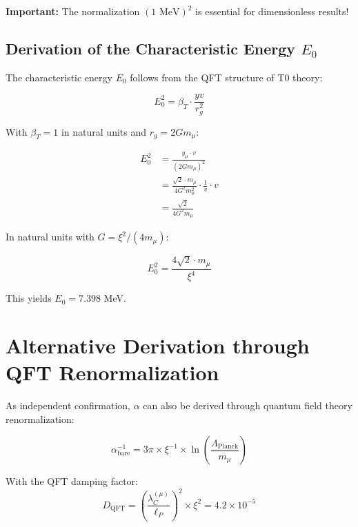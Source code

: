 \documentclass[12pt,a4paper]{article}
\begin{document}
	\begin{important}
		\textbf{Important:} The normalization $(1 \text{ MeV})^2$ is essential for dimensionless results!
	\end{important}
	
	\subsection{Derivation of the Characteristic Energy $E_0$}
	
	The characteristic energy $E_0$ follows from the QFT structure of T0 theory:
	
	\begin{equation}
		E_0^2 = \beta_T \cdot \frac{yv}{r_g^2}
	\end{equation}
	
	With $\beta_T = 1$ in natural units and $r_g = 2Gm_\mu$:
	
	\begin{align}
		E_0^2 &= \frac{y_\mu \cdot v}{(2Gm_\mu)^2}\\
		&= \frac{\sqrt{2} \cdot m_\mu}{4G^2 m_\mu^2} \cdot \frac{1}{v} \cdot v\\
		&= \frac{\sqrt{2}}{4G^2 m_\mu}
	\end{align}
	
	In natural units with $G = \xi^2/(4m_\mu)$:
	
	\begin{equation}
		E_0^2 = \frac{4\sqrt{2} \cdot m_\mu}{\xi^4}
	\end{equation}
	
	This yields $E_0 = 7.398$ MeV.
	
	\section{Alternative Derivation through QFT Renormalization}
	
	As independent confirmation, $\alpha$ can also be derived through quantum field theory renormalization:
	
	\begin{equation}
		\alpha_{\text{bare}}^{-1} = 3\pi \times \xi^{-1} \times \ln\left(\frac{\Lambda_{\text{Planck}}}{m_\mu}\right)
	\end{equation}
	
	With the QFT damping factor:
	\begin{equation}
		D_{\text{QFT}} = \left(\frac{\lambda_C^{(\mu)}}{\ell_P}\right)^{2} \times \xi^2 = 4.2 \times 10^{-5}
	\end{equation}
	
\end{document}
